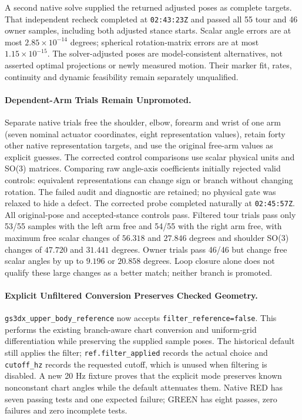 \documentclass[11pt,a4paper]{article}
\begin{document}
A second native solve supplied the returned adjusted poses as complete
targets. That independent recheck completed at \texttt{02:43:23Z} and
passed all 55 tour and 46 owner samples, including both adjusted stance
starts. Scalar angle errors are at most $2.85\times10^{-14}$ degrees;
spherical rotation-matrix errors are at most $1.15\times10^{-15}$.
The solver-adjusted poses are model-consistent alternatives, not asserted
optimal projections or newly measured motion. Their marker fit, rates,
continuity and dynamic feasibility remain separately unqualified.

\paragraph{Dependent-Arm Trials Remain Unpromoted.}
Separate native trials free the shoulder, elbow, forearm and wrist of one
arm (seven nominal actuator coordinates, eight representation values),
retain forty other native representation targets, and use the original
free-arm values as explicit guesses. The corrected control comparisons
use scalar physical units and SO(3) matrices. Comparing raw angle-axis
coefficients initially rejected valid controls: equivalent representations
can change sign or branch without changing rotation. The failed audit and
diagnostic are retained; no physical gate was relaxed to hide a defect.
The corrected probe completed naturally at \texttt{02:45:57Z}.
All original-pose and accepted-stance controls pass. Filtered tour trials
pass only 53/55 samples with the left arm free and 54/55 with the right
arm free, with maximum free scalar changes of $56.318$ and $27.846$
degrees and shoulder SO(3) changes of $47.720$ and $31.441$ degrees.
Owner trials pass 46/46 but change free scalar angles by up to $9.196$
or $20.858$ degrees. Loop closure alone does not qualify these large
changes as a better match; neither branch is promoted.

\paragraph{Explicit Unfiltered Conversion Preserves Checked Geometry.}
\texttt{gs3dx\_upper\_body\_reference} now accepts
\texttt{filter\_reference=false}. This performs the existing branch-aware
chart conversion and uniform-grid differentiation while preserving the
supplied sample poses. The historical default still applies the filter;
\texttt{ref.filter\_applied} records the actual choice and
\texttt{cutoff\_hz} records the requested cutoff, which is unused when
filtering is disabled. A new 20 Hz fixture proves that the explicit mode
preserves known nonconstant chart angles while the default attenuates them.
Native RED has seven passing tests and one expected failure; GREEN has
eight passes, zero failures and zero incomplete tests.
\end{document}
